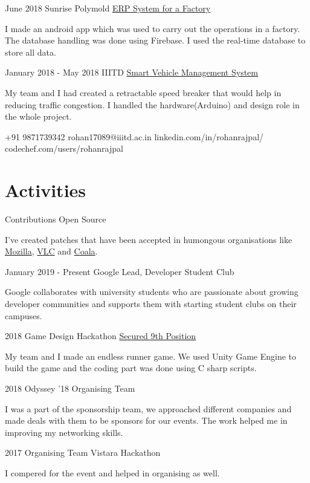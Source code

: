 \documentclass{tccv}
\begin{document}
\begin{eventlist}
\item{June 2018}
    {Sunrise Polymold}
    {\href{https://youtu.be/mjULJuEKHKk}{ERP System for a Factory}}
    
    I made an android app which was used to carry out the operations in a factory. The database handling was done using Firebase. I used the real-time database to store all data.

    
\item{January 2018 - May 2018}
     {IIITD}
     {\href{https://youtu.be/4MwRjWmVerA}{Smart Vehicle Management System}}

My team and I had created a retractable speed breaker that would help in reducing traffic congestion. I handled the hardware(Arduino) and design role in the whole project.

    {+91 9871739342}
    {rohan17089@iiitd.ac.in}
    {linkedin.com/in/rohanrajpal/}
    {codechef.com/users/rohanrajpal}
    
    
\section{Activities}
\item
    {}
    {Contributions}
    {Open Source}
    
    I've created patches that have been accepted in humongous organisations like \href{https://bugzilla.mozilla.org/show_bug.cgi?id=1422035}{Mozilla}, \href{https://trac.videolan.org/vlc/ticket/21952}{VLC} and \href{https://github.com/coala/documentation/pull/590}{Coala}.
    
\item{January 2019 - Present}
    {Google}
    {Lead, Developer Student Club}
    
    Google collaborates with university students who are passionate about growing developer communities and supports them with starting student clubs on their campuses.
    
\item
    {2018}
    {Game Design Hackathon}
    {\href{https://rohanrajpal.itch.io/need-my-space}{Secured 9th Position}}
    
    My team and I made an endless runner game. We used Unity Game Engine to build the game and the coding part was done using C sharp scripts.
    
    
\item{2018}
     {Odyssey '18}
     {Organising Team}

I was a part of the sponsorship team, we approached different companies and made deals with them to be sponsors for our events.
The work helped me in improving my networking skills.

\item
{2017}
    {Organising Team}
    {Vistara Hackathon}
    
    I compered for the event and helped in organising as well.
    
\end{eventlist}
\end{document}
